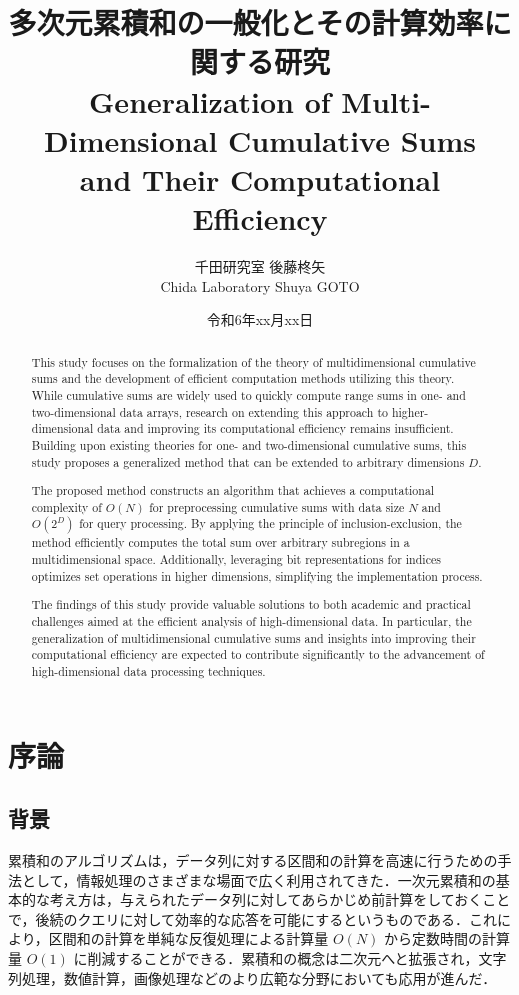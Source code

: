 \documentclass[12pt]{jsreport}
\title{多次元累積和の一般化とその計算効率に関する研究 \\Generalization of Multi-Dimensional Cumulative Sums \\ and Their Computational Efficiency}
\author{千田研究室 \quad 後藤柊矢\\Chida Laboratory \quad Shuya GOTO}
\date{令和6年xx月xx日}
\theoremstyle{plain} %
\theoremstyle{definition}
\begin{document}
\maketitle

\renewcommand{\abstractname}{Abstract}
\begin{abstract}
This study focuses on the formalization of the theory of multidimensional cumulative sums and the development of efficient computation methods utilizing this theory. While cumulative sums are widely used to quickly compute range sums in one- and two-dimensional data arrays, research on extending this approach to higher-dimensional data and improving its computational efficiency remains insufficient. Building upon existing theories for one- and two-dimensional cumulative sums, this study proposes a generalized method that can be extended to arbitrary dimensions \(D\).

The proposed method constructs an algorithm that achieves a computational complexity of \({O}(N)\) for preprocessing cumulative sums with data size \(N\) and \({O}(2^D)\) for query processing. By applying the principle of inclusion-exclusion, the method efficiently computes the total sum over arbitrary subregions in a multidimensional space. Additionally, leveraging bit representations for indices optimizes set operations in higher dimensions, simplifying the implementation process.

The findings of this study provide valuable solutions to both academic and practical challenges aimed at the efficient analysis of high-dimensional data. In particular, the generalization of multidimensional cumulative sums and insights into improving their computational efficiency are expected to contribute significantly to the advancement of high-dimensional data processing techniques.

\end{abstract}

\tableofcontents

\chapter{序論}

\section{背景}

累積和のアルゴリズムは，データ列に対する区間和の計算を高速に行うための手法として，情報処理のさまざまな場面で広く利用されてきた．一次元累積和の基本的な考え方は，与えられたデータ列に対してあらかじめ前計算をしておくことで，後続のクエリに対して効率的な応答を可能にするというものである．これにより，区間和の計算を単純な反復処理による計算量 \({O}(N)\) から定数時間の計算量 \({O}(1)\) に削減することができる．累積和の概念は二次元へと拡張され，文字列処理，数値計算，画像処理などのより広範な分野においても応用が進んだ\cite{BlellochTR90}．
\end{document}
